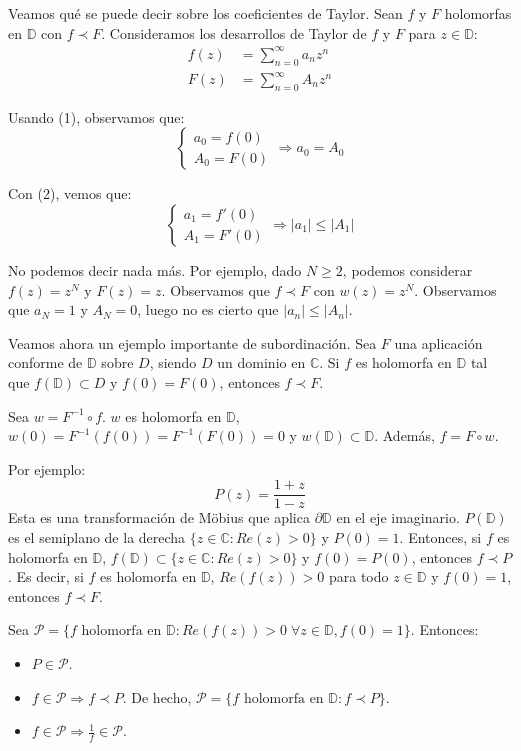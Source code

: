 \begin{remark}
    Veamos qué se puede decir sobre los coeficientes de Taylor.
    Sean $f$ y $F$ holomorfas en $\mathbb{D}$ con $f \prec F$.
    Consideramos los desarrollos de Taylor de $f$ y $F$ para $z \in \mathbb{D}$:
    \begin{align*}
        f(z) & = \sum_{n=0}^\infty a_nz^n \\
        F(z) & = \sum_{n=0}^\infty A_nz^n
    \end{align*}

    Usando (1), observamos que:
    $$\begin{cases}
            a_0 = f(0) \\
            A_0 = F(0)
        \end{cases} \Rightarrow a_0 = A_0$$

    Con (2), vemos que:
    $$\begin{cases}
            a_1 = f'(0) \\
            A_1 = F'(0)
        \end{cases} \Rightarrow |a_1| \leq |A_1|$$

    No podemos decir nada más.
    Por ejemplo, dado $N \geq 2$, podemos considerar $f(z) = z^N$ y $F(z) = z$.
    Observamos que $f \prec F$ con $w(z) = z^N$.
    Observamos que $a_N = 1$ y $A_N = 0$, luego no es cierto que $|a_n| \leq |A_n|$.
\end{remark}

Veamos ahora un ejemplo importante de subordinación.
Sea $F$ una aplicación conforme de $\mathbb{D}$ sobre $D$, siendo $D$ un dominio en $\mathbb{C}$.
Si $f$ es holomorfa en $\mathbb{D}$ tal que $f(\mathbb{D}) \subset D$ y $f(0) = F(0)$, entonces $f \prec F$.

Sea $w = F^{-1} \circ f$.
$w$ es holomorfa en $\mathbb{D}$, $w(0) = F^{-1}(f(0)) = F^{-1}(F(0)) = 0$ y $w(\mathbb{D}) \subset \mathbb{D}$.
Además, $f = F \circ w$.

Por ejemplo:
$$P(z) = \frac{1+z}{1-z}$$
Esta es una transformación de Möbius que aplica $\partial \mathbb{D}$ en el eje imaginario.
$P(\mathbb{D})$ es el semiplano de la derecha $\{z \in \mathbb{C} : Re(z) > 0\}$ y $P(0) = 1$.
Entonces, si $f$ es holomorfa en $\mathbb{D}$, $f(\mathbb{D}) \subset \{z \in \mathbb{C} : Re(z) > 0\}$ y $f(0) = P(0)$, entonces $f \prec P$.
Es decir, si $f$ es holomorfa en $\mathbb{D}$, $Re(f(z)) > 0$ para todo $z \in \mathbb{D}$ y $f(0) = 1$, entonces $f \prec F$.

Sea $\mathcal{P} = \{f \text{ holomorfa en } \mathbb{D} : Re(f(z)) > 0 \; \forall z \in \mathbb{D}, f(0) = 1\}$.
Entonces:
\begin{itemize}
    \item $P \in \mathcal{P}$.
    \item $f \in \mathcal{P} \Rightarrow f \prec P$.
          De hecho, $\mathcal{P} = \{f \text{ holomorfa en } \mathbb{D} : f \prec P\}$.
    \item $f \in \mathcal{P} \Rightarrow \frac{1}{f} \in \mathcal{P}$.
\end{itemize}

